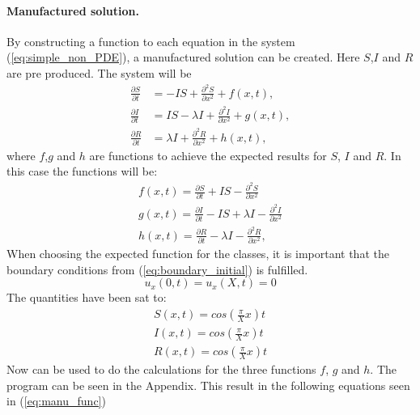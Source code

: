 \documentclass[%
twoside,                 %
final,                   %
10pt]{article}
\begin{document}
\paragraph{Manufactured solution.}
By constructing a function to each equation in the system (\ref{eq:simple_non_PDE}), a manufactured solution can be created. Here $S$,$I$ and $R$ are pre produced. The system will be
\begin{equation} \label{eq:simple_non_PDE2}
	\begin{aligned}
	\frac{\partial S}{\partial t} &= -IS + \frac{\partial^2 S}{\partial x^2}+f(x,t),\\
	\frac{\partial I}{\partial t} &= IS- \lambda I + \frac{\partial^2 I}{\partial x^2}+g(x,t),\\
	\frac{\partial R}{\partial t} &= \lambda I + \frac{\partial^2 R}{\partial x^2}+h(x,t),
	\end{aligned}
\end{equation}
where $f$,$g$ and $h$ are functions to achieve the expected results for $S$, $I$ and $R$. In this case the functions will be:
\begin{equation}
	\begin{aligned}
	f(x,t) = \frac{\partial S}{\partial t} + IS - \frac{\partial^2 S}{\partial x^2}\\
	g(x,t) = \frac{\partial I}{\partial t} - IS + \lambda I - \frac{\partial^2 I}{\partial x^2}\\
	h(x,t) = \frac{\partial R}{\partial t} -\lambda I - \frac{\partial^2 R}{\partial x^2},
	\end{aligned}
\end{equation}
When choosing the expected function for the classes, it is important that the boundary conditions from (\ref{eq:boundary_initial}) is fulfilled.
\begin{equation}
    u_x(0,t) = u_x(X,t) = 0
\end{equation}
The quantities have been sat to:
\begin{equation}
	\begin{aligned}
    S(x,t) = cos(\frac{\pi}{X}x)t\\
    I(x,t) = cos(\frac{\pi}{X}x)t\\
    R(x,t) = cos(\frac{\pi}{X}x)t
	\end{aligned}
\end{equation}
Now  can be used to do the calculations for the three functions $f$, $g$ and $h$. The program can be seen in the Appendix. This result in the following equations seen in (\ref{eq:manu_func}) 
\end{document}
